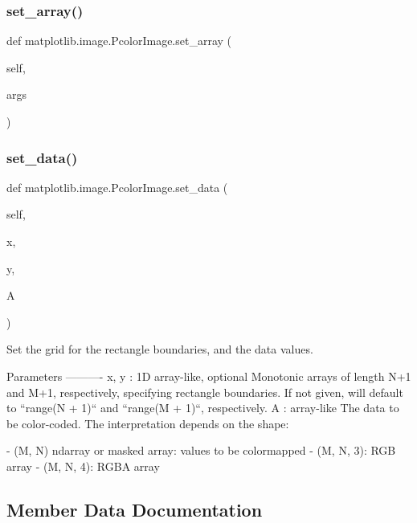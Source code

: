 \subsubsection{\texorpdfstring{set\+\_\+array()}{set\_array()}}
{\footnotesize\ttfamily def matplotlib.\+image.\+Pcolor\+Image.\+set\+\_\+array (\begin{DoxyParamCaption}\item[{}]{self,  }\item[{}]{args }\end{DoxyParamCaption})}

\mbox{\label{classmatplotlib_1_1image_1_1PcolorImage_add0f07a055acd14f51d46dc7924de64c}} 
\subsubsection{\texorpdfstring{set\+\_\+data()}{set\_data()}}
{\footnotesize\ttfamily def matplotlib.\+image.\+Pcolor\+Image.\+set\+\_\+data (\begin{DoxyParamCaption}\item[{}]{self,  }\item[{}]{x,  }\item[{}]{y,  }\item[{}]{A }\end{DoxyParamCaption})}

\begin{DoxyVerb}Set the grid for the rectangle boundaries, and the data values.

Parameters
----------
x, y : 1D array-like, optional
    Monotonic arrays of length N+1 and M+1, respectively, specifying
    rectangle boundaries.  If not given, will default to
    ``range(N + 1)`` and ``range(M + 1)``, respectively.
A : array-like
    The data to be color-coded. The interpretation depends on the
    shape:

    - (M, N) ndarray or masked array: values to be colormapped
    - (M, N, 3): RGB array
    - (M, N, 4): RGBA array
\end{DoxyVerb}
 

\subsection{Member Data Documentation}
\mbox{\label{classmatplotlib_1_1image_1_1PcolorImage_a4b2984e4cdcbd9b19259f47723f83804}} 
